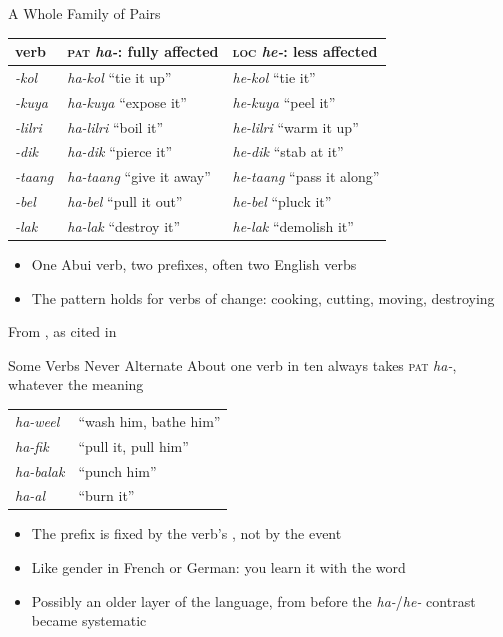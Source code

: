 \documentclass{beamer}
\begin{document}
\begin{frame}{A Whole Family of Pairs}
  \begin{center}
    \begin{tabular}{lll}
      \toprule
      verb & \textsc{pat} \emph{ha-}: fully affected & \textsc{loc} \emph{he-}: less affected \\
      \midrule
      \emph{-kol}   & \emph{ha-kol}   ``tie it up''    & \emph{he-kol}   ``tie it'' \\
      \emph{-kuya}  & \emph{ha-kuya}  ``expose it''    & \emph{he-kuya}  ``peel it'' \\
      \emph{-lilri} & \emph{ha-lilri} ``boil it''      & \emph{he-lilri} ``warm it up'' \\
      \emph{-dik}   & \emph{ha-dik}   ``pierce it''    & \emph{he-dik}   ``stab at it'' \\
      \emph{-taang} & \emph{ha-taang} ``give it away'' & \emph{he-taang} ``pass it along'' \\
      \emph{-bel}   & \emph{ha-bel}   ``pull it out''  & \emph{he-bel}   ``pluck it'' \\
      \emph{-lak}   & \emph{ha-lak}   ``destroy it''   & \emph{he-lak}   ``demolish it'' \\
      \bottomrule
    \end{tabular}
  \end{center}
  \vfill
  \begin{itemize}
  \item One Abui verb, two prefixes, often two English verbs
  \item The pattern holds for verbs of change: cooking, cutting, moving, destroying
  \end{itemize}
  \vfill
  \footnotesize
  From \citet[222--228]{kratochvil:delpada:2015}, as cited in \citet{klamer:kratochvil:2018}
\end{frame}

\begin{frame}{Some Verbs Never Alternate}
  About one verb in ten always takes \textsc{pat} \emph{ha-}, whatever the meaning
  \begin{center}
    \begin{tabular}{ll}
      \toprule
      \emph{ha-weel}  & ``wash him, bathe him'' \\
      \emph{ha-fik}   & ``pull it, pull him'' \\
      \emph{ha-balak} & ``punch him'' \\
      \emph{ha-al}    & ``burn it'' \\
      \bottomrule
    \end{tabular}
  \end{center}
  \vfill
  \begin{itemize}
  \item The prefix is fixed by the verb's , not by
    the event \citep{fedden:etal:2014}
  \item Like gender in French or German: you learn it with the word
  \item Possibly an older layer of the language, from before the
    \emph{ha-}/\emph{he-} contrast became systematic
  \end{itemize}
\end{frame}
\end{document}
